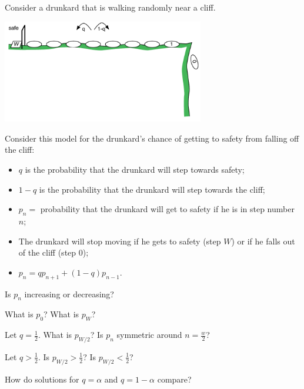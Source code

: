 \bookonlynewpage

\question
	Consider a drunkard that is walking randomly near a cliff.

	\hfill \includegraphics*[width=250pt]{images/module26-drunk.pdf}
	\vspace{-70pt}

	\begin{minipage}{.9\textwidth}
		Consider this model for the drunkard's chance of getting to safety from falling off the cliff:
		\begin{itemize}
			\item $q$ is the probability that the drunkard will step towards safety;
			\item $1-q$ is the probability that the drunkard will step towards the cliff;
			\item $p_n=$ probability that the drunkard will get to safety if he is in step number $n$; 
			\item The drunkard will stop moving if he gets to safety (step $W$) or if he falls out of the cliff (step $0$); \\
	
			\item $p_n = q p_{n+1} + (1-q) p_{n-1}$. \\
		\end{itemize}
	\end{minipage}

	
	\begin{parts}
		\item Is $p_n$ increasing or decreasing?
		\item What is $p_0$? What is $p_W$?
		\item Let $q=\frac12$. What is $p_{W/2}$? Is $p_n$ symmetric around $n=\frac{w}{2}$?
		\item Let $q>\frac12$. Is $p_{W/2} > \frac12$? Is $p_{W/2} < \frac12$? 
		\item How do solutions for $q=\alpha$ and $q=1-\alpha$ compare?
	\end{parts}


